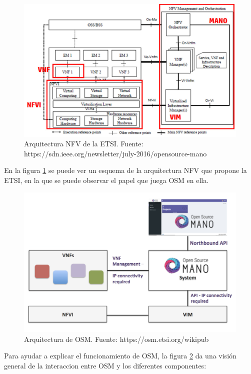 \begin{figure}[!ht]
	\centering
	\includegraphics[width=0.8\linewidth]{imagenes/nfv_etsi_Arch}
	\caption{Arquitectura NFV de la ETSI. 
		Fuente: https://sdn.ieee.org/newsletter/july-2016/opensource-mano}
	\label{fig:nfvetsiarch}
\end{figure}

En la figura \ref{fig:nfvetsiarch} se puede ver un esquema de la arquitectura NFV que propone la ETSI, en la que se puede observar el papel que juega OSM en ella. 

\clearpage

\begin{figure}[!ht]
	\centering
	\includegraphics[width=0.8\linewidth]{imagenes/osm_arch}
	\caption{Arquitectura de OSM. 
		Fuente: https://osm.etsi.org/wikipub}
	\label{fig:osmarch}
\end{figure}

Para ayudar a explicar el funcionamiento de OSM, la figura \ref{fig:osmarch} da una visión general de la interaccion entre OSM y los diferentes componentes:

